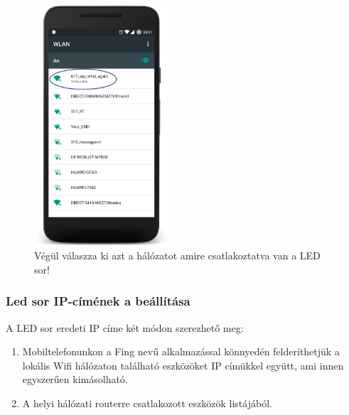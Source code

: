 \documentclass[../main.tex]{subfiles}
\begin{document}
            \begin{figure}[!h]
                \centering
                \includegraphics[width=5cm]{android_res/screen_pictures/wifi_err_03.png}
                \caption{Végül válaszza ki azt a hálózatot amire csatlakoztatva van a LED sor!}
                \label{fig:wifi_err_03}
            \end{figure}
        
        \subsubsection{Led sor IP-címének a beállítása}
            A LED sor eredeti IP címe két módon szerezhető meg:
            
            \begin{enumerate}
                \item Mobiltelefonunkon a Fing nevű alkalmazással könnyedén felderíthetjük a lokális Wifi hálózaton található eszközöket IP címükkel együtt, ami innen egyszerűen kimásolható.
                \item A helyi hálózati routerre csatlakozott eszközök listájából.
            \end{enumerate}
            
\end{document}
